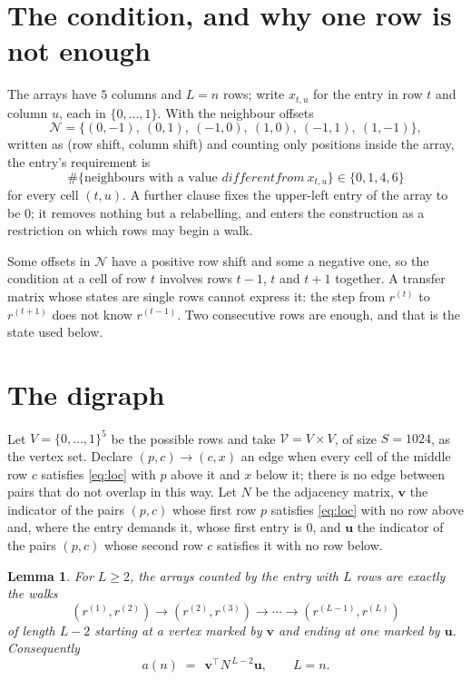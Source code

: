 \documentclass[11pt,a4paper]{article}
\theoremstyle{plain}
\newtheorem{lemma}[theorem]{Lemma}
\theoremstyle{definition}
\begin{document}
\section{The condition, and why one row is not enough}

The arrays have $5$ columns and $L=n$ rows; write $x_{t,u}$ for the entry in
row $t$ and column $u$, each in $\{0,\dots,1\}$. With the neighbour offsets
\[
\mathcal N=\{(0,-1),\ (0,1),\ (-1,0),\ (1,0),\ (-1,1),\ (1,-1)\},
\]
written as (row shift, column shift) and counting only positions inside the array, the
entry's requirement is
\begin{equation}\label{eq:loc}
\#\{\text{neighbours with a value }different from\ x_{t,u}\}\in\{0,1,4,6\}
\end{equation}
for every cell $(t,u)$. A further clause fixes the upper-left entry of the array to be $0$; it removes nothing but a relabelling, and enters the construction as a restriction on which rows may begin a walk.

Some offsets in $\mathcal N$ have a positive row shift and some a negative one, so the
condition at a cell of row $t$ involves rows $t-1$, $t$ and $t+1$ together. A transfer
matrix whose states are single rows cannot express it: the step from $r^{(t)}$ to
$r^{(t+1)}$ does not know $r^{(t-1)}$. Two consecutive rows are enough, and that is
the state used below.

\section{The digraph}

Let $V=\{0,\dots,1\}^{5}$ be the possible rows and take
$\mathcal V=V\times V$, of size $S=1024$, as the vertex set. Declare $(p,c)\to(c,x)$ an edge
when every cell of the middle row $c$ satisfies \eqref{eq:loc} with $p$ above it and $x$
below it; there is no edge between pairs that do not overlap in this way. Let $N$ be the
adjacency matrix, $\mathbf{v}$ the indicator of the pairs $(p,c)$ whose first row $p$
satisfies \eqref{eq:loc} with no row above and, where the entry demands it, whose first entry is $0$, and $\mathbf{u}$ the indicator of
the pairs $(p,c)$ whose second row $c$ satisfies it with no row below.

\begin{lemma}\label{lem:walk}
For $L\ge2$, the arrays counted by the entry with $L$ rows are exactly the walks
\[
(r^{(1)},r^{(2)})\to(r^{(2)},r^{(3)})\to\cdots\to(r^{(L-1)},r^{(L)})
\]
of length $L-2$ starting at a vertex marked by $\mathbf{v}$ and ending at one marked by
$\mathbf{u}$. Consequently
\[
a(n)\;=\;\,\mathbf{v}^{\!\top}N^{\,L-2}\mathbf{u},\qquad L=n .
\]
\end{lemma}
\end{document}
